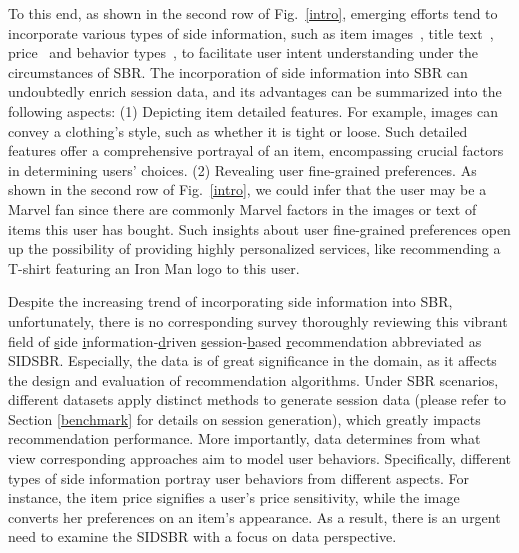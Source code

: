 \documentclass[lettersize,journal]{IEEEtran}
\newcommand{\fig}{Fig.\xspace}
\newcommand{\baby}{{SIDSBR}\xspace}
\begin{document}
To this end, as shown in the second row of \fig~\ref{intro}, emerging efforts tend to incorporate various types of side information, such as item images~\cite{P-RNN,MMSBR}, title text~\cite{liu@WWW2020,hou@KDD2022}, price~\cite{CoHHN,BiPNet} and behavior types~\cite{meng@SIGIR2020,Yuan@ICDE2022}, to facilitate user intent understanding under the circumstances of SBR. The incorporation of side information into SBR can undoubtedly enrich session data, and its advantages can be summarized into the following aspects:  (1) Depicting item detailed features. For example, images can convey a clothing's style, such as whether it is tight or loose. Such detailed features offer a comprehensive portrayal of an item, encompassing crucial factors in determining users' choices. (2) Revealing user fine-grained preferences. As shown in the second row of \fig~\ref{intro}, we could infer that the user may be a Marvel fan since there are commonly Marvel factors in the images or text of items this user has bought. Such insights about user fine-grained preferences open up the possibility of providing highly personalized services, like recommending a T-shirt featuring an Iron Man logo to this user.

Despite the increasing trend of incorporating side information into SBR, unfortunately, there is no corresponding survey thoroughly reviewing this vibrant field of \underline{s}ide \underline{i}nformation-\underline{d}riven \underline{s}ession-\underline{b}ased \underline{r}ecommendation abbreviated as \baby. Especially, the data is of great significance in the domain, as it affects the design and evaluation of recommendation algorithms. Under SBR scenarios, different datasets apply distinct methods to generate session data (please refer to Section \ref{benchmark} for details on session generation), which greatly impacts recommendation performance. More importantly, data determines from what view corresponding approaches aim to model user behaviors. Specifically, different types of side information portray user behaviors from different aspects. For instance, the item price signifies a user's price sensitivity, while the image converts her preferences on an item's appearance. As a result, there is an urgent need to examine the \baby with a focus on data perspective.
\end{document}
